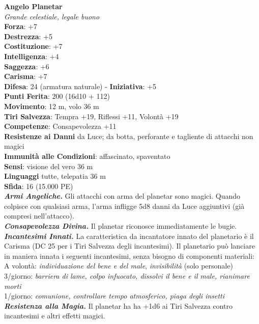 \begin{multicols}{2}
\medskip\textbf{Angelo Planetar}\\
\emph{Grande celestiale, legale buono}\\
\textbf{Forza}: +7\\
\textbf{Destrezza}: +5\\
\textbf{Costituzione}: +7\\
\textbf{Intelligenza}: +4\\
\textbf{Saggezza}: +6\\
\textbf{Carisma}: +7\\
\textbf{Difesa}: 24 (armatura naturale) - \textbf{Iniziativa}: +5\\
\textbf{Punti Ferita}: 200 (16d10 + 112)\\
\textbf{Movimento}: 12 m, volo 36 m\\
\textbf{Tiri Salvezza}: Tempra +19, Riflessi +11, Volontà +19\\
\textbf{Competenze}: Consapevolezza +11\\
\textbf{Resistenze ai Danni} da Luce; da botta, perforante e tagliente di attacchi non magici\\
\textbf{Immunità alle Condizioni}: affascinato, spaventato\\
\textbf{Sensi}: visione del vero 36 m\\
\textbf{Linguaggi} tutte, telepatia 36 m\\
\textbf{Sfida}: 16 (15.000 PE)\smallskip\\
\emph{\textbf{Armi Angeliche.}} Gli attacchi con arma del planetar sono magici. Quando colpisce con qualsiasi arma, l'arma infligge 5d8 danni da Luce aggiuntivi (già compresi nell'attacco).\\
\emph{\textbf{Consapevolezza Divina.}} Il planetar riconosce immediatamente le bugie.\\
\emph{\textbf{Incantesimi Innati.}} La caratteristica da incantatore innato del planetario è il Carisma (DC  25 per i Tiri Salvezza degli incantesimi). Il planetario può lanciare in maniera innata i seguenti incantesimi, senza bisogno di componenti materiali:\\
A volontà: \emph{individuazione del bene e del male}, \emph{invisibilità} (solo personale)\\
3/giorno: \emph{barriera di lame, colpo infuocato, dissolvi il bene e il} \emph{male, rianimare morti}\\
1/giorno: \emph{comunione, controllare tempo atmosferico, piaga degli insetti}\\
\emph{\textbf{Resistenza alla Magia.}} Il planetar ha ha +1d6 ai Tiri Salvezza contro incantesimi e altri effetti magici.\\

\end{multicols}
